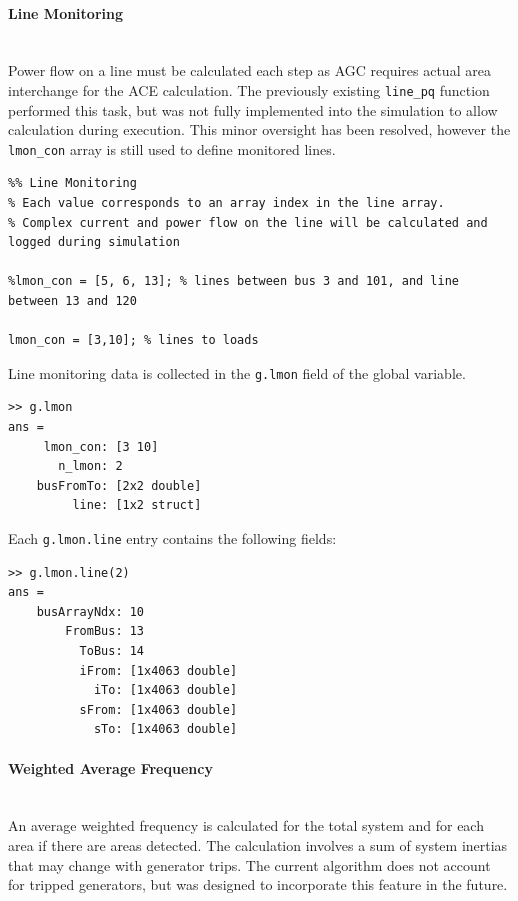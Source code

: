 \documentclass[12pt]{article}
\begin{document}
\paragraph{Line Monitoring} \ \\
Power flow on a line must be calculated each step as AGC requires actual area interchange for the ACE calculation.
The previously existing \verb|line_pq| function performed this task, but was not fully implemented into the simulation to allow calculation during execution.
This minor oversight has been resolved, however the \verb|lmon_con| array is still used to define monitored lines.

\begin{verbatim}
%% Line Monitoring
% Each value corresponds to an array index in the line array.
% Complex current and power flow on the line will be calculated and logged during simulation

%lmon_con = [5, 6, 13]; % lines between bus 3 and 101, and line between 13 and 120

lmon_con = [3,10]; % lines to loads
\end{verbatim}

Line monitoring data is collected in the \verb|g.lmon| field of the global variable.

\begin{verbatim}
>> g.lmon
ans = 
     lmon_con: [3 10]
       n_lmon: 2
    busFromTo: [2x2 double]
         line: [1x2 struct]
\end{verbatim}

Each \verb|g.lmon.line| entry contains the following fields:

\begin{verbatim}
>> g.lmon.line(2)
ans = 
    busArrayNdx: 10
        FromBus: 13
          ToBus: 14
          iFrom: [1x4063 double]
            iTo: [1x4063 double]
          sFrom: [1x4063 double]
            sTo: [1x4063 double]
\end{verbatim}

\paragraph{Weighted Average Frequency} \ \\
An average weighted frequency is calculated for the total system and for each area if there are areas detected.
The calculation involves a sum of system inertias that may change with generator trips.
The current algorithm does not account for tripped generators, but was designed to incorporate this feature in the future.
\end{document}
